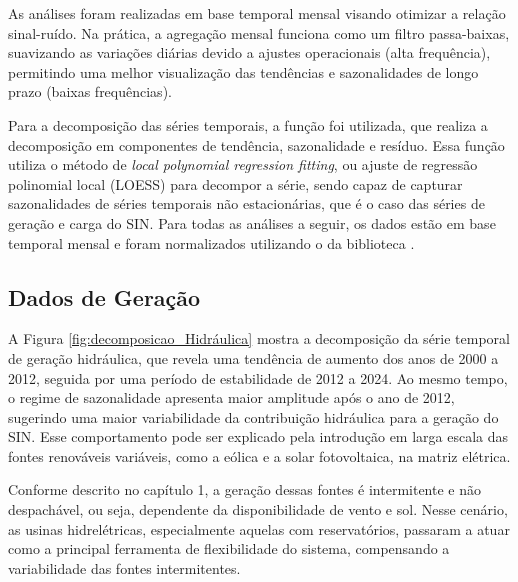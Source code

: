As análises foram realizadas em base temporal mensal visando otimizar a relação sinal-ruído. Na prática, a agregação
mensal funciona como um filtro passa-baixas, suavizando as variações diárias devido a ajustes operacionais (alta frequência),
permitindo uma melhor visualização das tendências e sazonalidades de longo prazo (baixas frequências). 

Para a decomposição das séries temporais, a função  foi utilizada, que realiza a decomposição em componentes de 
tendência, sazonalidade e resíduo. Essa função utiliza o método de \textit{local polynomial regression fitting}, ou ajuste
de regressão polinomial local (LOESS) para decompor a série, sendo capaz de capturar sazonalidades de séries temporais
não estacionárias, que é o caso das séries de geração e carga do SIN. Para todas as análises a seguir, os dados estão
em base temporal mensal e foram normalizados utilizando o  da biblioteca .

\subsection{Dados de Geração} %
A Figura \ref{fig:decomposicao_Hidráulica} mostra a decomposição da série temporal de geração hidráulica, que revela uma 
tendência de aumento dos anos de 2000 a 2012, seguida por uma período de estabilidade de 2012 a 2024. Ao mesmo tempo,
o regime de sazonalidade apresenta maior amplitude após o ano de 2012, sugerindo uma maior variabilidade da contribuição
hidráulica para a geração do SIN. Esse comportamento pode ser explicado pela introdução em larga escala das fontes renováveis 
variáveis, como a eólica e a solar fotovoltaica, na matriz elétrica. \cite{Silva2016}
\begin{figure}[!ht]
  {}
  {}
\end{figure}

\begin{figure}[!ht]
  {}
  {}
\end{figure}

Conforme descrito no capítulo 1, a geração dessas fontes é intermitente e não despachável, ou seja, dependente da 
disponibilidade de vento e sol. Nesse cenário, as usinas hidrelétricas, especialmente aquelas com reservatórios, passaram 
a atuar como a principal ferramenta de flexibilidade do sistema, compensando a variabilidade das fontes intermitentes. 

